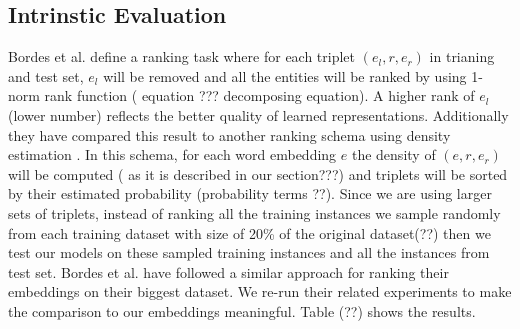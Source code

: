 \documentclass[preprint,12pt]{elsarticle}
\begin{document}
    \subsection{Intrinstic Evaluation}
    \label{exp:rank}
     Bordes et al. define a ranking task where for each triplet $(e_{l} , r, e_{r} ) $ in trianing and test set,
     $e_{l}$ will be removed and all the entities will be ranked by 
     using 1-norm rank function  ( equation ??? decomposing equation). A higher rank of $e_{l}$ (lower number)
     reflects the better quality of learned representations. Additionally they have compared this result to
     another ranking schema using density estimation . 
     In this schema, for each word embedding $e$ the density of $(e , r, e_{r} )$ will be computed
     ( as it is described in our section???) and triplets will be sorted by their estimated probability 
     (probability terms ??). Since we are using larger sets of triplets, instead of ranking
     all the training instances
     we sample randomly from each training dataset with size of 20\% of the original dataset(??) then
     we test our models on these sampled training instances and all the instances from test set. Bordes et al. have followed
     a similar  approach for ranking their embeddings on their biggest dataset. We re-run  their related experiments to make 
     the comparison to our embeddings meaningful. Table (??) shows the results.
\FloatBarrier
\end{document}
